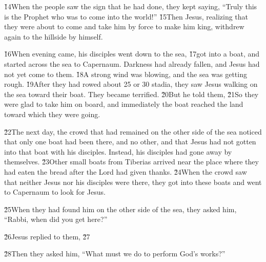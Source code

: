 \v{14}When the people saw the sign that he had done, they kept saying, ``Truly this is the Prophet who was to come into the world!'' \v{15}Then Jesus, realizing that they were about to come and take him by force to make him king, withdrew again to the hillside by himself.

\v{16}When evening came, his disciples went down to the sea, \v{17}got into a boat, and started across the sea to Capernaum. Darkness had already fallen, and Jesus had not yet come to them. \v{18}A strong wind was blowing, and the sea was getting rough. \v{19}After they had rowed about 25 or 30 stadia, they saw Jesus walking on the sea toward their boat. They became terrified. \v{20}But he told them,  \v{21}So they were glad to take him on board, and immediately the boat reached the land toward which they were going.

\v{22}The next day, the crowd that had remained on the other side of the sea noticed that only one boat had been there, and no other, and that Jesus had not gotten into that boat with his disciples. Instead, his disciples had gone away by themselves. \v{23}Other small boats from Tiberias arrived near the place where they had eaten the bread after the Lord had given thanks. \v{24}When the crowd saw that neither Jesus nor his disciples were there, they got into these boats and went to Capernaum to look for Jesus.

\v{25}When they had found him on the other side of the sea, they asked him, ``Rabbi, when did you get here?''

\v{26}Jesus replied to them,   \v{27}

\v{28}Then they asked him, ``What must we do to perform God's works?''

